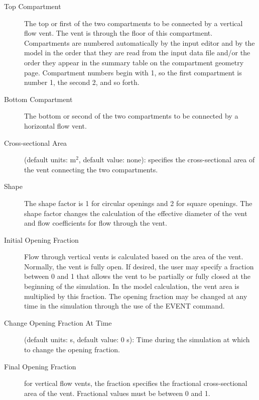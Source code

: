 \begin{description}
\item[Top Compartment] The top or first of the two compartments to be connected by a vertical flow vent. The vent is through the floor of this compartment.  Compartments are numbered automatically by the input editor and by the model in the order that they are read from the input data file and/or the order they appear in the summary table on the compartment geometry page. Compartment numbers begin with 1, so the first compartment is number 1, the second 2, and so forth.

\item[Bottom Compartment] The bottom or second of the two compartments to be connected by a horizontal flow vent.

\item[Cross-sectional Area] (default units: m$^2$, default value: none): specifies the cross-sectional area of the vent connecting the two compartments.

\item[Shape] The shape factor is 1 for circular openings and 2 for square openings. The shape factor changes the calculation of the effective diameter of the vent and flow coefficients for flow through the vent.

\item[Initial Opening Fraction] Flow through vertical vents is calculated based on the area of the vent.  Normally, the vent is fully open.  If desired, the user may specify a fraction between 0 and 1 that allows the vent to be partially or fully closed at the beginning of the simulation.  In the model calculation, the vent area is multiplied by this fraction.  The opening fraction may be changed at any time in the simulation through the use of the EVENT command.

\item[Change Opening Fraction At Time] (default units: s, default value: 0 s): Time during the simulation at which to change the opening fraction.

\item[Final Opening Fraction] for vertical flow vents, the fraction specifies the fractional cross-sectional area of the vent. Fractional values must be between 0 and 1.
\end{description}

